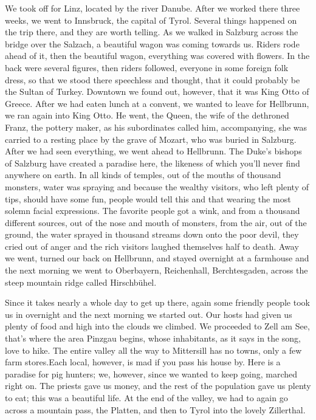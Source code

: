 We took off for Linz, located by the river Danube. After we worked there three weeks, we went to Innsbruck, the capital of Tyrol. Several things happened on the trip there, and they are worth telling. As we walked in Salzburg across the bridge over the Salzach, a beautiful wagon was coming towards us. Riders rode ahead of it, then the beautiful wagon, everything was covered with flowers. In the back were several figures, then riders followed, everyone in some foreign folk dress, so that we stood there speechless and thought, that it could probably be the Sultan of Turkey. Downtown we found out, however, that it was King Otto of Greece. After we had eaten lunch at a convent, we wanted to leave for Hellbrunn, we ran again into King Otto. He went, the Queen, the wife of the dethroned Franz, the pottery maker, as his subordinates called him, accompanying, she was carried to a resting place by the grave of Mozart, who was buried in Salzburg. After we had seen everything, we went ahead to Hellbrunn. The Duke's bishops of Salzburg have created a paradise here, the likeness of which you'll never find anywhere on earth. In all kinds of temples, out of the mouths of thousand monsters, water was spraying and because the wealthy visitors, who left plenty of tips, should have some fun, people would tell this and that wearing the most solemn facial expressions. The favorite people got a wink, and from a thousand different sources, out of the nose and mouth of monsters, from the air, out of the ground, the water sprayed in thousand streams down onto the poor devil, they cried out of anger and the rich visitors laughed themselves half to death. Away we went, turned our back on Hellbrunn, and stayed overnight at a farmhouse and the next morning we went to Oberbayern, Reichenhall, Berchtesgaden, across the steep mountain ridge called Hirschbühel.

Since it takes nearly a whole day to get up there, again some friendly people took us in overnight and the next morning we started out. Our hosts had given us plenty of food and high into the clouds we climbed. We proceeded to Zell am See, that's where the area Pinzgau begins, whose inhabitants, as it says in the song, love to hike. The entire valley all the way to Mittersill has no towns, only a few farm stores.Each local, however, is mad if you pass his house by. Here is a paradise for pig hunters; we, however, since we wanted to keep going, marched right on. The priests gave us money, and the rest of the population gave us plenty to eat; this was a beautiful life. At the end of the valley, we had to again go across a mountain pass, the Platten, and then to Tyrol into the lovely Zillerthal.

